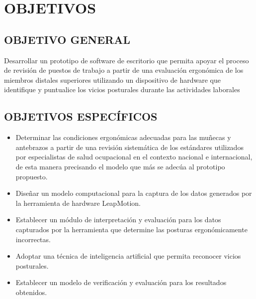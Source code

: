\chapter{OBJETIVOS}
\section{OBJETIVO GENERAL}
Desarrollar un prototipo de software de escritorio que permita apoyar el proceso de revisión de puestos de trabajo a partir de una evaluación ergonómica de los miembros distales superiores utilizando un dispositivo de hardware que identifique y puntualice los vicios posturales durante las actividades laborales
 
\section{OBJETIVOS ESPECÍFICOS}
\begin{itemize}
    \item Determinar las condiciones ergonómicas adecuadas para las muñecas y antebrazos a partir de una revisión sistemática de los estándares utilizados por especialistas de salud ocupacional en el contexto nacional e internacional, de esta manera precisando el modelo que más se adecúa al prototipo propuesto.
    \item Diseñar un modelo computacional para la captura de los datos generados por la herramienta de hardware LeapMotion.
    \item Establecer un módulo de interpretación y evaluación para los datos capturados por la herramienta que determine las posturas ergonómicamente incorrectas.
    \item Adoptar una técnica de inteligencia artificial que permita reconocer vicios posturales.
    \item Establecer un modelo de verificación y evaluación para los resultados obtenidos.
\end{itemize}